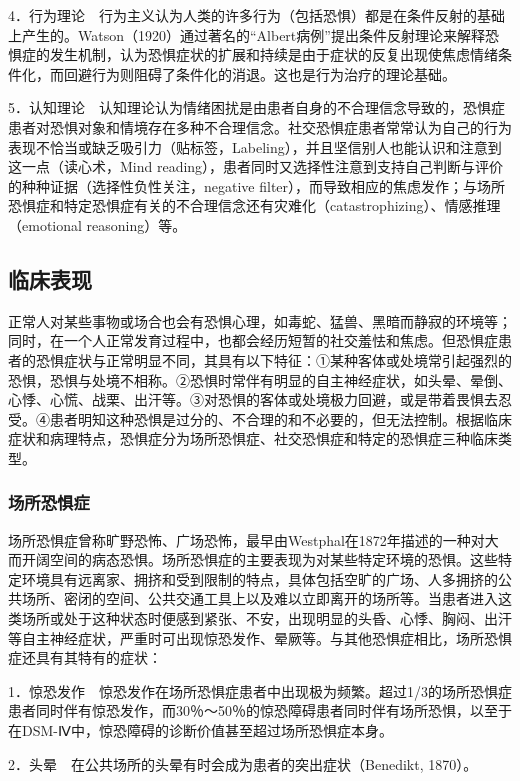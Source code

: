 4．行为理论　行为主义认为人类的许多行为（包括恐惧）都是在条件反射的基础上产生的。Watson（1920）通过著名的“Albert病例”提出条件反射理论来解释恐惧症的发生机制，认为恐惧症状的扩展和持续是由于症状的反复出现使焦虑情绪条件化，而回避行为则阻碍了条件化的消退。这也是行为治疗的理论基础。

5．认知理论　认知理论认为情绪困扰是由患者自身的不合理信念导致的，恐惧症患者对恐惧对象和情境存在多种不合理信念。社交恐惧症患者常常认为自己的行为表现不恰当或缺乏吸引力（贴标签，Labeling），并且坚信别人也能认识和注意到这一点（读心术，Mind
reading），患者同时又选择性注意到支持自己判断与评价的种种证据（选择性负性关注，negative
filter），而导致相应的焦虑发作；与场所恐惧症和特定恐惧症有关的不合理信念还有灾难化（catastrophizing）、情感推理（emotional
reasoning）等。

\subsection{临床表现}

正常人对某些事物或场合也会有恐惧心理，如毒蛇、猛兽、黑暗而静寂的环境等；同时，在一个人正常发育过程中，也都会经历短暂的社交羞怯和焦虑。但恐惧症患者的恐惧症状与正常明显不同，其具有以下特征：①某种客体或处境常引起强烈的恐惧，恐惧与处境不相称。②恐惧时常伴有明显的自主神经症状，如头晕、晕倒、心悸、心慌、战栗、出汗等。③对恐惧的客体或处境极力回避，或是带着畏惧去忍受。④患者明知这种恐惧是过分的、不合理的和不必要的，但无法控制。根据临床症状和病理特点，恐惧症分为场所恐惧症、社交恐惧症和特定的恐惧症三种临床类型。

\subsubsection{场所恐惧症}

场所恐惧症曾称旷野恐怖、广场恐怖，最早由Westphal在1872年描述的一种对大而开阔空间的病态恐惧。场所恐惧症的主要表现为对某些特定环境的恐惧。这些特定环境具有远离家、拥挤和受到限制的特点，具体包括空旷的广场、人多拥挤的公共场所、密闭的空间、公共交通工具上以及难以立即离开的场所等。当患者进入这类场所或处于这种状态时便感到紧张、不安，出现明显的头昏、心悸、胸闷、出汗等自主神经症状，严重时可出现惊恐发作、晕厥等。与其他恐惧症相比，场所恐惧症还具有其特有的症状：

1．惊恐发作　惊恐发作在场所恐惧症患者中出现极为频繁。超过1/3的场所恐惧症患者同时伴有惊恐发作，而30％～50％的惊恐障碍患者同时伴有场所恐惧，以至于在DSM-Ⅳ中，惊恐障碍的诊断价值甚至超过场所恐惧症本身。

2．头晕　在公共场所的头晕有时会成为患者的突出症状（Benedikt, 1870）。

